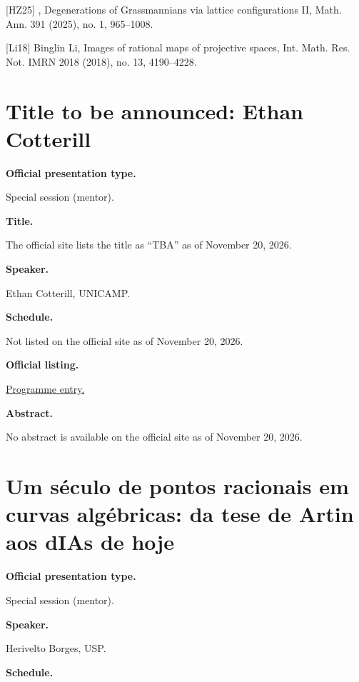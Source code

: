 [HZ25] , Degenerations of Grassmannians via
lattice configurations II, Math. Ann. 391
(2025), no. 1, 965–1008.

[Li18] Binglin Li, Images of rational maps of
projective spaces, Int. Math. Res. Not. IMRN
2018 (2018), no. 13, 4190–4228.

\section{Title to be announced: Ethan
Cotterill}
\label{section-tba-cotterill}

\medskip\noindent
{\bf Official presentation type.}

Special session (mentor).

\medskip\noindent
{\bf Title.}

The official site lists the title as
``TBA'' as of November 20, 2026.

\medskip\noindent
{\bf Speaker.}

Ethan Cotterill, UNICAMP.

\medskip\noindent
{\bf Schedule.}

Not listed on the official site as of
November 20, 2026.

\medskip\noindent
{\bf Official listing.}

\href{%
https://sites.google.com/view/%
geoalgcompluff/legal/%
legal-2027-resumos#h.6f5k7zdb7c47%
}{Programme entry.}

\medskip\noindent
{\bf Abstract.}

No abstract is available on the
official site as of November 20, 2026.

\section{Um século de pontos racionais em
curvas algébricas: da tese de Artin aos dIAs
de hoje}
\label{section-um-seculo-de-pontos-racionais}

\medskip\noindent
{\bf Official presentation type.}

Special session (mentor).

\medskip\noindent
{\bf Speaker.}

Herivelto Borges, USP.

\medskip\noindent
{\bf Schedule.}

